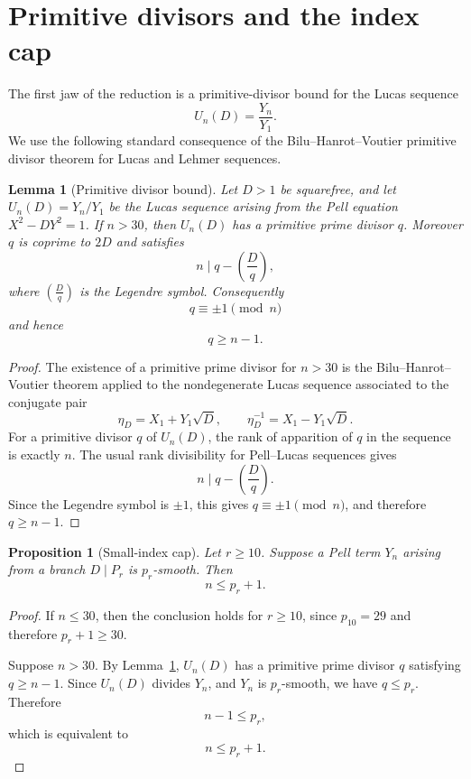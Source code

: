 \documentclass[11pt]{article}
\newtheorem{lemma}[theorem]{Lemma}
\newtheorem{proposition}[theorem]{Proposition}
\theoremstyle{definition}
\begin{document}
\section{Primitive divisors and the index cap}

The first jaw of the reduction is a primitive-divisor bound for the Lucas sequence
\[
        U_n(D)=\frac{Y_n}{Y_1}.
\]
We use the following standard consequence of the Bilu--Hanrot--Voutier primitive 
divisor theorem for Lucas and Lehmer sequences.

\begin{lemma}[Primitive divisor bound]\label{lem:primitive}
Let $D>1$ be squarefree, and let $U_n(D)=Y_n/Y_1$ be the Lucas sequence arising 
from the Pell equation $X^2-DY^2=1$.  If $n>30$, then $U_n(D)$ has a primitive 
prime divisor $q$.  Moreover $q$ is coprime to $2D$ and satisfies
\[
        n\mid q-\left(\frac{D}{q}\right),
\]
where $\left(\frac{D}{q}\right)$ is the Legendre symbol.  Consequently
\[
        q\equiv \pm 1 \pmod n
\]
and hence
\[
        q\ge n-1.
\]
\end{lemma}

\begin{proof}
The existence of a primitive prime divisor for $n>30$ is the Bilu--Hanrot--Voutier 
theorem applied to the nondegenerate Lucas sequence associated to the conjugate pair
\[
        \eta_D=X_1+Y_1\sqrt D,
        \qquad
        \eta_D^{-1}=X_1-Y_1\sqrt D.
\]
For a primitive divisor $q$ of $U_n(D)$, the rank of apparition of $q$ in the sequence 
is exactly $n$.  The usual rank divisibility for Pell--Lucas sequences gives
\[
        n\mid q-\left(\frac{D}{q}\right).
\]
Since the Legendre symbol is $\pm 1$, this gives $q\equiv\pm 1 \pmod n$, and therefore $q \ge n-1$.
\end{proof}

\begin{proposition}[Small-index cap]\label{prop:index-cap}
Let $r \ge 10$.  Suppose a Pell term $Y_n$ arising from a branch $D \mid P_r$ is $p_r$-smooth.  Then
\[
        n \le p_r+1.
\]
\end{proposition}

\begin{proof}
If $n \le 30$, then the conclusion holds for $r\ge10$, since $p_{10}=29$ and therefore $p_r+1\ge30$.

Suppose $n>30$.  By Lemma~\ref{lem:primitive}, $U_n(D)$ has a primitive prime divisor 
$q$ satisfying $q\ge n-1$.  Since $U_n(D)$ divides $Y_n$, and $Y_n$ is $p_r$-smooth, 
we have $q \le p_r$.  Therefore
\[
        n-1 \le p_r,
\]
which is equivalent to
\[
        n \le p_r+1.
\]
\end{proof}
\end{document}
